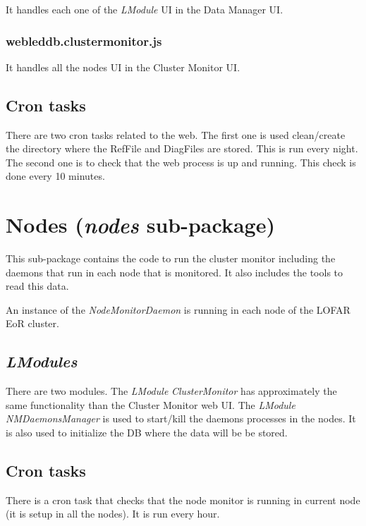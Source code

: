 \documentclass[a4paper,11pt]{article}
\begin{document}
It handles each one of the \textit{LModule} UI in the Data Manager UI.

\subsubsection*{webleddb.clustermonitor.js}

It handles all the nodes UI in the Cluster Monitor UI.  
 
\subsection{Cron tasks}
\label{sec:leddbcron}

There are two cron tasks related to the web. The first one is used clean/create the directory where the RefFile and DiagFiles are stored. This is run every night.
The second one is to check that the web process is up and running. This check is done every 10 minutes.

\section{Nodes (\textit{nodes} sub-package)}
\label{sec:nodes}

This sub-package contains the code to run the cluster monitor including the daemons that run in each node that is monitored. It also includes the tools to read this data.

An instance of the \textit{NodeMonitorDaemon} is running in each node of the LOFAR EoR cluster. 

\subsection{\textit{LModules}}

There are two modules. The \textit{LModule} \textit{ClusterMonitor} has approximately the same functionality than the Cluster Monitor web UI. The \textit{LModule} \textit{NMDaemonsManager} is used to start/kill the daemons processes in the nodes.
It is also used to initialize the DB where the data will be be stored.

\subsection{Cron tasks}

There is a cron task that checks that the node monitor is running in current node (it is setup in all the nodes). It is run every hour.
\end{document}
